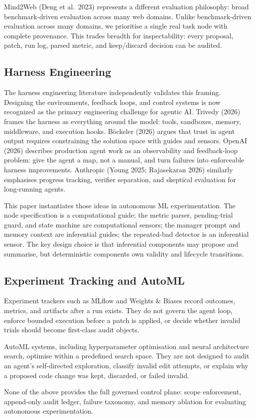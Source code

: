 Mind2Web (Deng et al.~2023) represents a different evaluation philosophy: broad benchmark-driven evaluation across many web domains. Unlike benchmark-driven evaluation across many domains, we prioritise a single real task node with complete provenance. This trades breadth for inspectability: every proposal, patch, run log, parsed metric, and keep/discard decision can be audited.

\subsection{Harness Engineering}\label{harness-engineering}

The harness engineering literature independently validates this framing. Designing the environments, feedback loops, and control systems is now recognized as the primary engineering challenge for agentic AI. Trivedy (2026) frames the harness as everything around the model: tools, sandboxes, memory, middleware, and execution hooks. Böckeler (2026) argues that trust in agent output requires constraining the solution space with guides and sensors. OpenAI (2026) describes production agent work as an observability and feedback-loop problem: give the agent a map, not a manual, and turn failures into enforceable harness improvements. Anthropic (Young 2025; Rajasekaran 2026) similarly emphasises progress tracking, verifier separation, and skeptical evaluation for long-running agents.

This paper instantiates those ideas in autonomous ML experimentation. The node specification is a computational guide; the metric parser, pending-trial guard, and state machine are computational sensors; the manager prompt and memory context are inferential guides; the repeated-bad detector is an inferential sensor. The key design choice is that inferential components may propose and summarise, but deterministic components own validity and lifecycle transitions.

\subsection{Experiment Tracking and AutoML}\label{experiment-tracking-and-automl}

Experiment trackers such as MLflow and Weights \& Biases record outcomes, metrics, and artifacts after a run exists. They do not govern the agent loop, enforce bounded execution before a patch is applied, or decide whether invalid trials should become first-class audit objects.

AutoML systems, including hyperparameter optimisation and neural architecture search, optimise within a predefined search space. They are not designed to audit an agent's self-directed exploration, classify invalid edit attempts, or explain why a proposed code change was kept, discarded, or failed invalid.

None of the above provides the full governed control plane: scope enforcement, append-only audit ledger, failure taxonomy, and memory ablation for evaluating autonomous experimentation.

